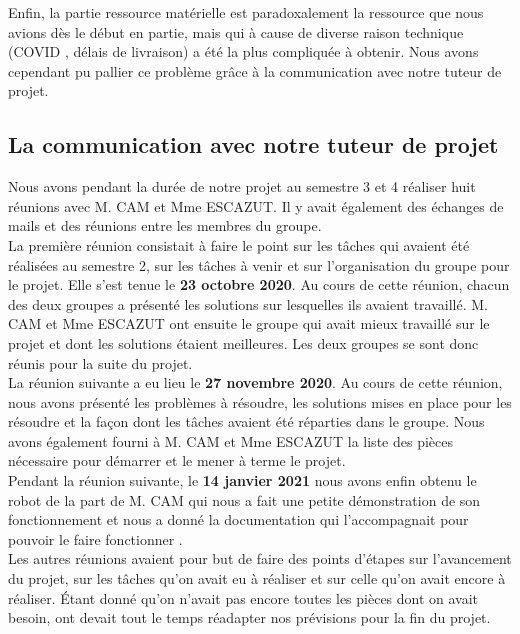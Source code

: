 \documentclass{PackagerQualityN}
\begin{document}
Enfin, la partie ressource matérielle est paradoxalement la ressource que nous avions dès le début en partie, mais qui à cause de diverse raison technique (COVID , délais de livraison) a été la plus compliquée à obtenir. Nous avons cependant pu pallier  ce problème grâce à la communication avec notre tuteur de projet.

\subsection*{La communication avec notre tuteur de projet}

Nous avons pendant la durée de notre projet au semestre 3 et 4 réaliser huit réunions avec M. CAM et Mme ESCAZUT. Il y avait également des échanges de mails et des réunions entre les membres du groupe.\\

La première réunion consistait à faire le point sur les tâches qui avaient été réalisées au semestre 2, sur les tâches à venir et sur l’organisation du groupe pour le projet. Elle s’est tenue le \textbf{23 octobre 2020}. Au cours de cette réunion, chacun des deux groupes a présenté les solutions sur lesquelles ils avaient travaillé. M. CAM et Mme ESCAZUT ont ensuite le groupe qui avait mieux travaillé sur le projet et dont les solutions étaient meilleures. Les deux groupes se sont donc réunis pour la suite du projet.\\

La réunion suivante a eu lieu le \textbf{27 novembre 2020}. Au cours de cette réunion, nous avons présenté les problèmes à résoudre, les solutions mises en place pour les résoudre et la façon dont les tâches avaient été réparties dans le groupe. Nous avons également fourni à M. CAM et Mme ESCAZUT la liste des pièces nécessaire pour démarrer et le mener à terme le projet. \\

Pendant la réunion suivante, le \textbf{14 janvier 2021} nous avons enfin obtenu le robot de la part de M. CAM qui nous a fait une petite démonstration de son fonctionnement et nous a donné la documentation qui l’accompagnait pour pouvoir le faire fonctionner .\\

Les autres réunions avaient pour but de faire des points d’étapes sur l’avancement du projet, sur les tâches qu’on avait eu à réaliser et sur celle qu’on avait encore à réaliser. Étant donné qu’on n’avait pas encore toutes les pièces dont on avait besoin, ont devait tout le temps réadapter nos prévisions pour la fin du projet.
\newp
\end{document}
